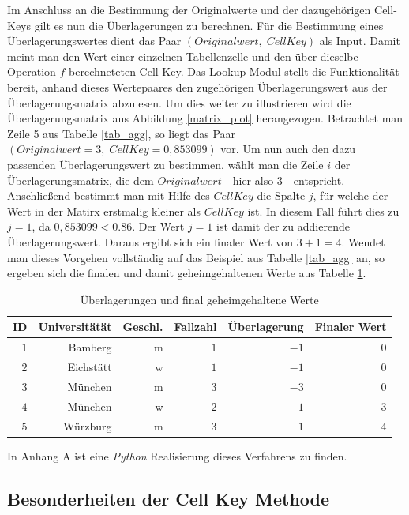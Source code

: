 Im Anschluss an die Bestimmung der Originalwerte und der dazugehörigen Cell-Keys gilt es nun die Überlagerungen zu berechnen. Für die Bestimmung eines Überlagerungswertes dient das Paar $(Originalwert, \; CellKey)$ als Input. Damit meint man den Wert einer einzelnen Tabellenzelle und den über dieselbe Operation $f$ berechneteten Cell-Key. Das Lookup Modul stellt die Funktionalität bereit, anhand dieses Wertepaares den zugehörigen Überlagerungswert aus der Überlagerungsmatrix abzulesen. Um dies weiter zu illustrieren wird die Überlagerungsmatrix aus Abbildung \ref{matrix_plot} herangezogen. Betrachtet man Zeile 5 aus Tabelle \ref{tab_agg}, so liegt das Paar $(Originalwert = 3, \; CellKey = 0,853099)$ vor. Um nun auch den dazu passenden Überlagerungswert zu bestimmen, wählt man die Zeile $i$ der Überlagerungsmatrix, die dem $Originalwert$ - hier also $3$ - entspricht. Anschlie\ss end bestimmt man mit Hilfe des $CellKey$ die Spalte $j$, für welche der Wert in der Matirx erstmalig kleiner als $CellKey$ ist. In diesem Fall führt dies zu $j = 1$, da $0,853099 < 0.86$. Der Wert $j = 1$ ist damit der zu addierende Überlagerungswert. Daraus ergibt sich ein finaler Wert von $3 + 1 = 4$. Wendet man dieses Vorgehen vollständig auf das Beispiel aus Tabelle \ref{tab_agg} an, so ergeben sich die finalen und damit geheimgehaltenen Werte aus Tabelle \ref{tab_final}.

\begin{table}[h]
    \centering
    \begin{tabular}{ r r r r r r}
        \textbf{ID} \vline & \textbf{Universitätät} & \textbf{Geschl.} & \textbf{Fallzahl} & \textbf{Überlagerung} & \textbf{Finaler Wert} \\ 
        \hline
        $1$ \vline & Bamberg & m & $1$ & $-1$ & $0$ \\
        $2$ \vline & Eichstätt & w & $1$ & $-1$ & $0$ \\
        $3$ \vline & München & m & $3$ & $-3$ & $0$ \\
        $4$ \vline & München & w & $2$ & $1$ & $3$ \\
        $5$ \vline & Würzburg & m & $3$ & $1$ & $4$
    \end{tabular}
    \caption{Überlagerungen und final geheimgehaltene Werte}
    \label{tab_final}
\end{table}

In Anhang A ist eine \textit{Python} Realisierung dieses Verfahrens zu finden.


\subsection{Besonderheiten der Cell Key Methode}%

